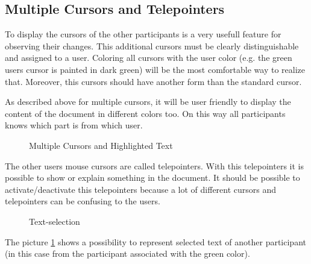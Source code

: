 \documentclass[11pt,a4paper]{article}
\begin{document}
\subsection{Multiple Cursors and Telepointers}
To display the cursors of the other participants is a very usefull feature for observing their changes. This additional cursors must be clearly distinguishable and assigned to a user. Coloring all cursors with the user color (e.g. the green users cursor is painted in dark green) will be the most comfortable way to realize that. Moreover, this cursors should have another form than the standard cursor.

As described above for multiple cursors, it will be user friendly to display the content of the document in different colors too. On this way all participants knows which part is from which user.
\begin{figure}[H]
\centering
{}
\caption{Multiple Cursors and Highlighted Text}
\end{figure}
The other users mouse cursors are called telepointers. With this telepointers it is possible to show or explain something in the document. It should be possible to activate/deactivate this telepointers because a lot of different cursors and telepointers can be confusing to the users.
\begin{figure}[H]
\centering
{}
\caption{Text-selection}
\label{Text-selection}
\end{figure}
The picture \ref{Text-selection} shows a possibility to represent selected text of another participant (in this case from the participant associated with the green color).
\end{document}
